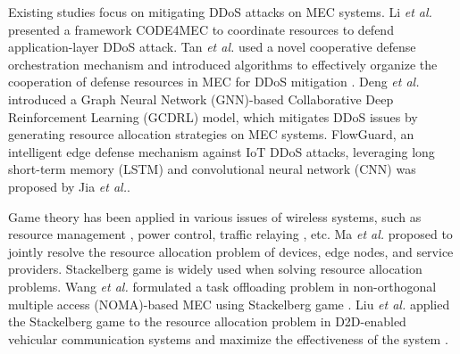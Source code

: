 \documentclass[10pt,journal, compsoc]{IEEEtran}
\begin{document}

Existing studies focus on mitigating DDoS attacks on MEC systems. Li \emph{et al.} presented a framework CODE4MEC to coordinate resources to defend application-layer DDoS attack\cite{Li2}. Tan \emph{et al.} used a novel cooperative defense orchestration mechanism and introduced algorithms to effectively organize the cooperation of defense resources in MEC for DDoS mitigation \cite{Tan}. Deng \emph{et al.} introduced a Graph Neural Network (GNN)-based Collaborative Deep Reinforcement Learning (GCDRL) model, which mitigates DDoS issues by generating resource allocation strategies on MEC systems\cite{Deng}. FlowGuard, an intelligent edge defense mechanism against IoT DDoS attacks, leveraging long short-term memory (LSTM) and convolutional neural network (CNN) \cite{Jia} was proposed by Jia \emph{et al.}.


Game theory has been applied in various issues of wireless systems, such as resource management \cite{Xu3}, power control\cite{Myung}, traffic relaying \cite{Li4}, etc. Ma \emph{et al.} proposed to jointly resolve the resource allocation problem of devices, edge nodes, and service providers\cite{Ma}. Stackelberg game is widely used when solving resource allocation problems. Wang \emph{et al.} formulated a task offloading problem in non-orthogonal multiple access (NOMA)-based MEC using Stackelberg game \cite{Wang2}. Liu \emph{et al.} applied the Stackelberg game to the resource allocation problem in D2D-enabled vehicular communication systems and maximize the effectiveness of the system \cite{Liu5}.
\end{document}
